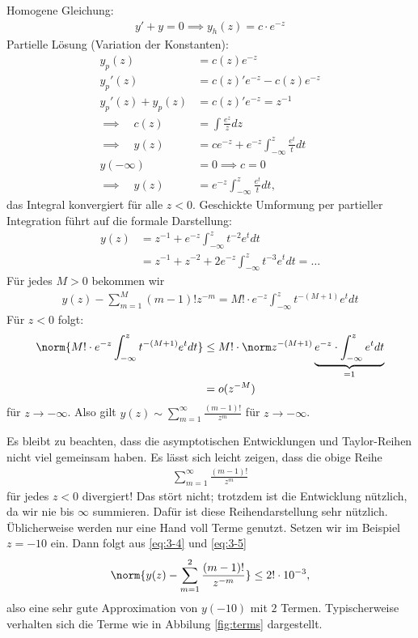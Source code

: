 \begin{beispiel}
Homogene Gleichung:
\begin{align*}
  y' + y = 0\implies y_{h}(z) = c\cdot e^{-z}
\end{align*}
Partielle Lösung (Variation der Konstanten):
\begin{align*}
  y_{p}(z) &= c(z)e^{-z}\\
  y_{p}'(z) &= c(z)'e^{-z} - c(z)e^{-z}\\
  y_{p}'(z) + y_{p}(z) &= c(z)'e^{-z}  = z^{-1}\\
\implies \quad c(z) &= \int \frac {e^{z}} z dz\\
\implies \quad y(z) &= c e^{-z} + e^{-z} \int_{- \infty}^{z} \frac{e^{t}}{t}dt\\
 y(-\infty)&= 0 \implies c = 0\\
\implies \quad y(z) &= e^{-z} \int_{- \infty}^{z} \frac{e^{t}}{t}dt, 
\end{align*}
das Integral konvergiert für alle $z < 0$. Geschickte Umformung per partieller Integration führt auf die formale Darstellung:
\begin{align*}
  y(z) &= z^{-1} + e^{-z} \int_{-\infty}^{z} t^{-2} e^{t}dt\\
&= z^{-1} + z^{-2} + 2e^{-z} \int_{-\infty}^{z} t^{-3} e^{t}dt = \dots 
\end{align*}
Für jedes $M> 0$ bekommen wir
\begin{align}\label{eq:3-4}
  y(z) - \sum_{m = 1}^{M}(m-1)! z^{-m} = M! \cdot e^{-z} \int_{-\infty}^{z}t^{-(M+1)}e^{t}dt
\end{align}
Für $z <0$ folgt:
\begin{align}\label{eq:3-5}
  \norm {M! \cdot e^{-z} \int_{- \infty}^{z} t^{-(M+1)} e^{t}dt}&\leq M!\cdot \norm z^{-(M+1)}\underbrace{e^{-z}\cdot\int_{-\infty}^{z}e^{t}dt}_{= 1}\\
&= o(z^{-M})\notag
\end{align}
für $z \to -\infty$. Also gilt $y(z) \sim \sum_{m = 1}^{\infty} \frac{(m-1)!}{z^{m}}$ für $z \to -\infty$.
\end{beispiel}
Es bleibt zu beachten, dass die asymptotischen Entwicklungen und Taylor-Reihen nicht viel gemeinsam haben. Es lässt sich leicht zeigen, dass die obige Reihe
\begin{align*}
  \sum_{ m = 1}^{\infty} \frac{(m-1)!}{z^{m}}
\end{align*}
für jedes $z < 0$ divergiert! Das stört nicht; trotzdem ist die Entwicklung nützlich, da wir nie bis $\infty$ summieren. Dafür ist diese Reihendarstellung sehr nützlich. Üblicherweise werden nur eine Hand voll Terme genutzt. Setzen wir im Beispiel $z  = - 10$ ein. Dann folgt aus \eqref{eq:3-4} und \eqref{eq:3-5}
\begin{align*}
  \norm{y(z) - \sum_{m = 1}^{2}\frac{(m-1)!} {z^{-m}}} \leq 2! \cdot 10^{-3}, 
\end{align*}
also eine sehr gute Approximation von $y(-10)$ mit $2$ Termen. Typischerweise verhalten sich die Terme wie in Abbilung \ref{fig:terms} dargestellt. 

